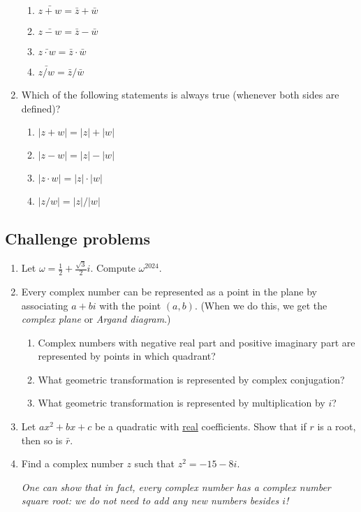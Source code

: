 \begin{enumerate}
\begin{enumerate}[label=(\Roman*)]
\item $\bar{z + w} = \bar{z} + \bar{w}$
\item $\bar{z - w} = \bar{z} - \bar{w}$
\item $\bar{z\cdot w} = \bar{z}\cdot\bar{w}$
\item $\bar{z/w} = \bar{z}/\bar{w}$
\end{enumerate}
\item Which of the following statements is always true (whenever both sides are defined)?
\begin{enumerate}[label=(\Roman*)]
\item $\lvert z + w\rvert = \lvert z\rvert + \lvert w\rvert$
\item $\lvert z - w\rvert = \lvert z\rvert - \lvert w\rvert$
\item $\lvert z\cdot w\rvert = \lvert z\rvert\cdot\lvert w\rvert$
\item $\lvert z/w\rvert = \lvert z\rvert / \lvert w\rvert$
\end{enumerate}
\end{enumerate}


\subsection{Challenge problems}

\begin{enumerate}[resume]
\item Let $\omega = \frac{1}{2} + \frac{\sqrt{3}}{2}i$. Compute $\omega^{2024}$.
\item Every complex number can be represented as a point in the plane by associating $a + bi$ with the point $(a,b)$. (When we do this, we get the \emph{complex plane} or \emph{Argand diagram}.)
\begin{enumerate}
\item Complex numbers with negative real part and positive imaginary part are represented by points in which quadrant?
\item What geometric transformation is represented by complex conjugation?
\item What geometric transformation is represented by multiplication by $i$?
\end{enumerate}
\item Let $ax^2 + bx + c$ be a quadratic with \underline{real} coefficients. Show that if $r$ is a root, then so is $\bar{r}$.
\item Find a complex number $z$ such that $z^2 = -15 - 8i$.\par
\emph{One can show that in fact, every complex number has a complex number square root: we do not need to add any new numbers besides $i$!}
\end{enumerate}


